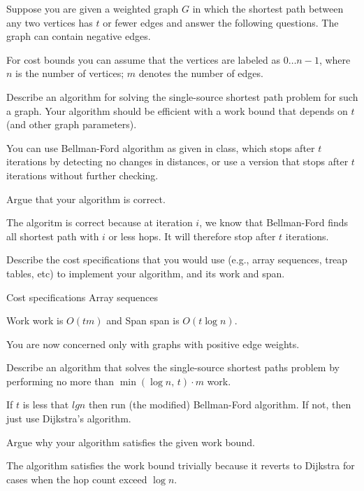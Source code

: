 Suppose you are given a weighted graph $G$ in which the shortest path
between any two vertices has $t$ or fewer edges and answer the
following questions.  The graph can contain negative edges.

For cost bounds you can assume that the vertices are labeled as $0
\ldots n-1$, where $n$ is the number of vertices; $m$ denotes the
number of edges.

\begin{problem}[6.]

\ask
Describe an algorithm for solving the single-source shortest %
path problem for such a graph.  Your algorithm should be efficient
with a work bound that depends on $t$ (and other graph parameters).

\sol
You can use Bellman-Ford algorithm as given in class, which stops
after $t$ iterations by detecting no changes in distances, or use a
version that stops after $t$ iterations without further checking.

\ask
Argue that your algorithm is correct.

\sol
  The algoritm is correct because at iteration $i$, we know that
  Bellman-Ford finds all shortest path with $i$ or less hops.  It will
  therefore stop after $t$ iterations.
\end{problem}


\begin{problem}[2.]

Describe the cost specifications that you would use (e.g., array sequences, treap tables, etc) to implement your algorithm,
and its work and  span.

\ask Cost specifications
\sol Array sequences~~~~~~~~~~~

\ask Work 
\sol  work is $O(tm)$ and 
\ask Span 
\sol  span is $O(t\log{n})$.
\end{problem}


\begin{problem}[4.]

You are now concerned only with graphs with positive edge
weights. 

\ask[2.]
Describe an algorithm that solves the single-source shortest
paths problem by performing no more than $\min ( \log{n}, \, {t} )
\cdot {m}$ work.  \vspace{1in}

\sol
  If $t$ is less that $lg n$ then run (the modified) Bellman-Ford
  algorithm.  If not, then just use Dijkstra's algorithm.


\ask[2.]
Argue why your algorithm satisfies the given work bound.

\sol
  The algorithm satisfies the work bound trivially because it reverts
  to Dijkstra for cases when the hop count exceed $\log n$.

\end{problem}


